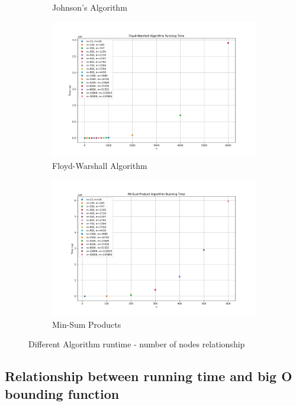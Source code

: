 \documentclass[11pt]{article}
\theoremstyle{plain}
\begin{document}
\begin{figure}[H]
\begin{subfigure}[b]{0.45\textwidth}
      \caption{Johnson's Algorithm}
  \end{subfigure}
  \hfill
  \begin{subfigure}[b]{0.45\textwidth}
      \centering
      \includegraphics[width=\textwidth]{../results/Floyd-Warshall_running_time.png}
      \caption{Floyd-Warshall Algorithm}
  \end{subfigure}
  \vfill
  \begin{subfigure}[b]{0.45\textwidth}
      \centering
      \includegraphics[width=\textwidth]{../results/MinSumProduct_running_time.png}
      \caption{Min-Sum Products}
  \end{subfigure}
  \caption{Different Algorithm runtime - number of nodes relationship}
\end{figure}

\subsection{Relationship between running time and big O bounding function}\
\end{document}
